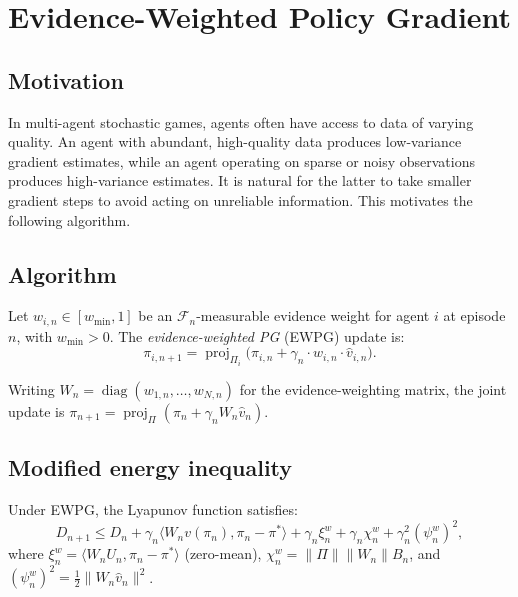\section{Evidence-Weighted Policy Gradient}
\label{sec:ewpg}

\subsection{Motivation}

In multi-agent stochastic games, agents often have access to data of varying quality. An agent with abundant, high-quality data produces low-variance gradient estimates, while an agent operating on sparse or noisy observations produces high-variance estimates. It is natural for the latter to take smaller gradient steps to avoid acting on unreliable information. This motivates the following algorithm.

\subsection{Algorithm}

\begin{definition}
\label{def:ewpg-ch7}
Let $w_{i,n} \in [w_{\min}, 1]$ be an $\mathcal{F}_n$-measurable evidence weight for agent $i$ at episode $n$, with $w_{\min} > 0$. The \emph{evidence-weighted PG} (EWPG) update is:
\begin{equation}
\label{eq:ewpg-ch7}
\tag{EWPG}
    \pi_{i,n+1} = \operatorname{proj}_{\Pi_i}\bigl(\pi_{i,n} + \gamma_n \cdot w_{i,n} \cdot \hat{v}_{i,n}\bigr).
\end{equation}
\end{definition}

Writing $W_n = \operatorname{diag}(w_{1,n}, \ldots, w_{N,n})$ for the evidence-weighting matrix, the joint update is $\pi_{n+1} = \operatorname{proj}_\Pi(\pi_n + \gamma_n W_n \hat{v}_n)$.

\subsection{Modified energy inequality}

\begin{lemma}
\label{lem:energy-ewpg-ch7}
Under EWPG, the Lyapunov function satisfies:
\begin{equation}
\label{eq:energy-ewpg-ch7}
    D_{n+1} \leq D_n + \gamma_n \langle W_n v(\pi_n), \pi_n - \pi^* \rangle + \gamma_n \xi_n^w + \gamma_n \chi_n^w + \gamma_n^2 (\psi_n^w)^2,
\end{equation}
where $\xi_n^w = \langle W_n U_n, \pi_n - \pi^* \rangle$ (zero-mean), $\chi_n^w = \|\Pi\| \|W_n\| B_n$, and $(\psi_n^w)^2 = \frac{1}{2}\|W_n \hat{v}_n\|^2$.
\end{lemma}

